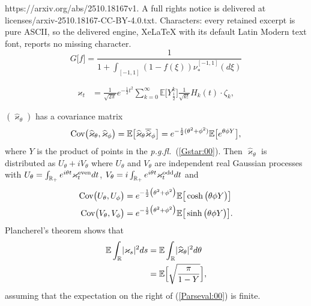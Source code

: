 \documentclass[10pt,a4paper]{amsart}
\def\even{{\text{\rm even}}}
\def\odd{{\text{\rm odd}}}
\def\pgfl{\emph{p.g.fl.~}}
\def\spin{{[-1,1]}}
\begin{document}
https://arxiv.org/abs/2510.18167v1. A full rights notice is delivered at licenses/arxiv-2510.18167-CC-BY-4.0.txt. Characters: every retained excerpt is pure ASCII, so the delivered engine, XeLaTeX with its default Latin Modern text font, reports no missing character.
\begin{equation}
G\big [f\big ]=\frac {1}{1 + \int_\spin (1-f(\xi))\nu_*^\spin(d\xi)}
\label{Gstar:00}
\end{equation}

\begin{align}
\varkappa_t
&= \frac{1}{\sqrt{2\pi}}e^{-\frac{1}{2}t^2}
\sum_{k=0}^\infty \mathbb{E}\big [Y_{\frac{1}{2}}^k\big ]
\frac{1}{\sqrt{k!}}H_k(t)\cdot \zeta_k,
\label{decomposition:22}
\end{align}

\begin{Proposition}\label{prop:complex}
$(\widehat{\varkappa}_\theta)$ has a covariance matrix
\begin{equation*}
\text{\rm Cov}\big (\widehat{\varkappa}_\theta ,\widehat{\varkappa}_\phi\big )
= \mathbb{E}\big [\widehat{\varkappa}_\theta \overline{\widehat{\varkappa}}_\phi\big ]
= e^{-\frac{1}{2}(\theta^2+\phi^2)}\mathbb{E}\big [e^{\theta\phi Y}\big ], 
\label{complexcv:00}
\end{equation*}
where $Y$ is the product of points in the \pgfl (\ref{Gstar:00}).
Then
$\widehat{\varkappa}_\theta$ is distributed as $U_\theta+iV_\theta$ where $U_\theta$ and $V_\theta$ are independent real Gaussian processes with 
$U_\theta = \int_{\mathbb{R}_+} e^{i\theta t}\varkappa_t^\even dt$,
$V_\theta = i\int_{\mathbb{R}_+} e^{i\theta t}\varkappa_t^\odd dt$
and
\begin{align}
 \text{\rm Cov}\big (U_\theta,U_\phi\big )
 &= 
 e^{-\frac{1}{2}\big (\theta^2+\phi^2\big )}
 \mathbb{E}\big [\cosh\big (\theta\phi Y\big )\big ]\nonumber \\
  \text{\rm Cov}\big (V_\theta,V_\phi\big )
 &= 
 e^{-\frac{1}{2}\big (\theta^2+\phi^2\big )}
\mathbb{E}\big [ \sinh\big (\theta\phi Y\big )\big ].
\label{covoddeven:00}
\end{align}
Plancherel's theorem shows that
\begin{align}
\mathbb{E}\int_{\mathbb{R}} \lvert\varkappa_s\rvert^2ds &= 
\mathbb{E}\int_{\mathbb{R}} \lvert\widehat{\varkappa}_\theta\rvert^2d\theta\nonumber \\
& = \mathbb{E}\Bigl [\sqrt { \frac{\pi}{1-Y} }\Bigr ],
\label{Parseval:00}
\end{align}
assuming that the expectation on the right of (\ref{Parseval:00}) is finite.
\end{Proposition}
\end{document}
